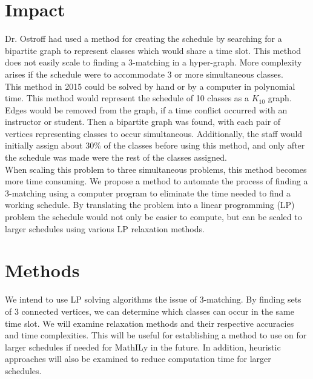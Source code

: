 \documentclass[11pt]{article}
\begin{document}
\section{Impact}
Dr. Ostroff had used a method for creating the schedule by searching for a bipartite graph to represent classes which would share a time slot. This method does not easily scale to finding a 3-matching in a hyper-graph. More complexity arises if the schedule were to accommodate 3 or more simultaneous classes.\\
\indent This method in 2015 could be solved by hand or by a computer in polynomial time. This method would represent the schedule of 10 classes as a $K_{10}$ graph. Edges would be removed from the graph, if a time conflict occurred with an instructor or student. Then a bipartite graph was found, with each pair of vertices representing classes to occur simultaneous. Additionally, the staff would initially assign about 30\% of the classes before using this method, and only after the schedule was made were the rest of the classes assigned.\\
\indent When scaling this problem to three simultaneous problems, this method becomes more time consuming. We propose a method to automate the process of finding a 3-matching using a computer program to eliminate the time needed to find a working schedule. By translating the problem into a linear programming (LP) problem the schedule would not only be easier to compute, but can be scaled to larger schedules using various LP relaxation methods.


\section{Methods}

We intend to use LP solving algorithms the issue of 3-matching. By finding sets of 3 connected vertices, we can determine which classes can occur in the same time slot. We will examine relaxation methods and their respective accuracies and time complexities. This will be useful for establishing a method to use on for larger schedules if needed for MathILy in the future. In addition, heuristic approaches will also be examined to reduce computation time for larger schedules.
\end{document}
